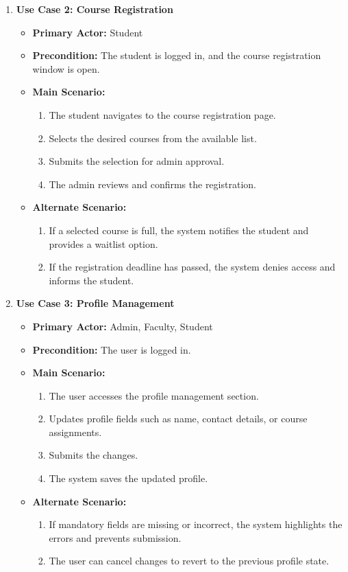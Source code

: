 \documentclass{scrreprt}
\begin{document}
\begin{enumerate}
    \item \textbf{Use Case 2: Course Registration}
    \begin{itemize}
        \item \textbf{Primary Actor:} Student
        \item \textbf{Precondition:} The student is logged in, and the course registration window is open.
        \item \textbf{Main Scenario:}
        \begin{enumerate}
            \item The student navigates to the course registration page.
            \item Selects the desired courses from the available list.
            \item Submits the selection for admin approval.
            \item The admin reviews and confirms the registration.
        \end{enumerate}
        \item \textbf{Alternate Scenario:}
        \begin{enumerate}
            \item If a selected course is full, the system notifies the student and provides a waitlist option.
            \item If the registration deadline has passed, the system denies access and informs the student.
        \end{enumerate}
    \end{itemize}

    \item \textbf{Use Case 3: Profile Management}
    \begin{itemize}
        \item \textbf{Primary Actor:} Admin, Faculty, Student
        \item \textbf{Precondition:} The user is logged in.
        \item \textbf{Main Scenario:}
        \begin{enumerate}
            \item The user accesses the profile management section.
            \item Updates profile fields such as name, contact details, or course assignments.
            \item Submits the changes.
            \item The system saves the updated profile.
        \end{enumerate}
        \item \textbf{Alternate Scenario:}
        \begin{enumerate}
            \item If mandatory fields are missing or incorrect, the system highlights the errors and prevents submission.
            \item The user can cancel changes to revert to the previous profile state.
        \end{enumerate}
    \end{itemize}


\end{enumerate}
\end{document}
